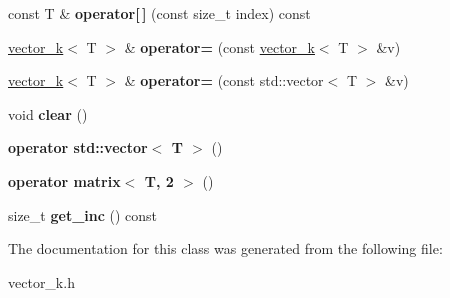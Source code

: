 \begin{DoxyCompactItemize}
\item 
\hypertarget{classkeycpp_1_1vector__k_af9fc299b3eecce09bb7166954acf7b16}{const T \& {\bfseries operator\mbox{[}$\,$\mbox{]}} (const size\-\_\-t index) const }\label{classkeycpp_1_1vector__k_af9fc299b3eecce09bb7166954acf7b16}

\item 
\hypertarget{classkeycpp_1_1vector__k_ab2030403334539d7df1001e8b9037fa9}{\hyperlink{classkeycpp_1_1vector__k}{vector\-\_\-k}$<$ T $>$ \& {\bfseries operator=} (const \hyperlink{classkeycpp_1_1vector__k}{vector\-\_\-k}$<$ T $>$ \&v)}\label{classkeycpp_1_1vector__k_ab2030403334539d7df1001e8b9037fa9}

\item 
\hypertarget{classkeycpp_1_1vector__k_a318832966719bc35aa0147ec2aeabb6f}{\hyperlink{classkeycpp_1_1vector__k}{vector\-\_\-k}$<$ T $>$ \& {\bfseries operator=} (const std\-::vector$<$ T $>$ \&v)}\label{classkeycpp_1_1vector__k_a318832966719bc35aa0147ec2aeabb6f}

\item 
\hypertarget{classkeycpp_1_1vector__k_a926f7d20093e3b36e92f10aaeea1e909}{void {\bfseries clear} ()}\label{classkeycpp_1_1vector__k_a926f7d20093e3b36e92f10aaeea1e909}

\item 
\hypertarget{classkeycpp_1_1vector__k_a54ffbb92ed1926e6066d26db886b4132}{{\bfseries operator std\-::vector$<$ T $>$} ()}\label{classkeycpp_1_1vector__k_a54ffbb92ed1926e6066d26db886b4132}

\item 
\hypertarget{classkeycpp_1_1vector__k_a0e0395cff74a011d44bd28db47f46f50}{{\bfseries operator matrix$<$ T, 2 $>$} ()}\label{classkeycpp_1_1vector__k_a0e0395cff74a011d44bd28db47f46f50}

\item 
\hypertarget{classkeycpp_1_1vector__k_a09f9ee871078a9f6602d564088a0e2ac}{size\-\_\-t {\bfseries get\-\_\-inc} () const }\label{classkeycpp_1_1vector__k_a09f9ee871078a9f6602d564088a0e2ac}

\end{DoxyCompactItemize}


The documentation for this class was generated from the following file\-:\begin{DoxyCompactItemize}
\item 
vector\-\_\-k.\-h\end{DoxyCompactItemize}
